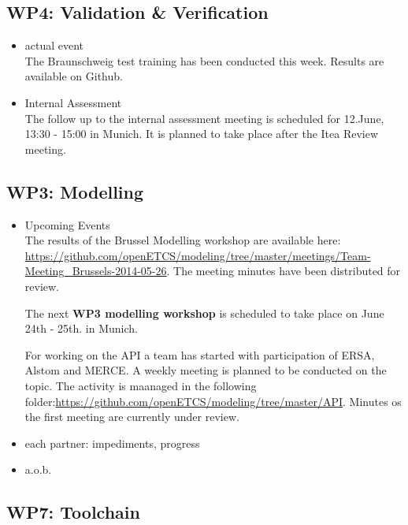 \documentclass[a4paper, 11pt]{article}
\begin{document}
\subsection{WP4: Validation \& Verification}
\begin{itemize}
\item actual event\\
The Braunschweig test training has been conducted this week. Results are available on Github.

\item Internal Assessment\\
The follow up to the internal assessment meeting is scheduled for 12.June, 13:30 - 15:00 in Munich. It is planned to take place after the Itea Review meeting.

\end{itemize}

\subsection{WP3: Modelling}

\begin{itemize}
\item Upcoming Events\\
The results of the Brussel Modelling workshop are available here: \url{https://github.com/openETCS/modeling/tree/master/meetings/Team-Meeting_Brussels-2014-05-26}. The meeting minutes have been distributed for review.

The next \textbf{WP3 modelling workshop} is  scheduled to take place on June  24th - 25th. in Munich.  

For working on the API a team has started with participation of ERSA, Alstom and MERCE. A weekly meeting is planned to be conducted on the topic. The activity is maanaged in the following folder:\url{https://github.com/openETCS/modeling/tree/master/API}. Minutes os the first meeting are currently under review.

\item each partner: impediments, progress\\

\item a.o.b.\\

\end{itemize}

\subsection{WP7: Toolchain}
\end{document}

